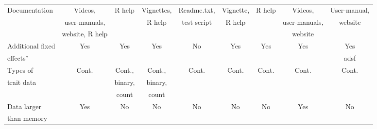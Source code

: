 \documentclass{article}
\begin{document}
\begin{landscape}
\begin{table}
\begin{tabular}{lcccccccc}
\hspace{1mm} Documentation        &  Videos,                &    R help       &  Vignettes,    &   Readme.txt,       &   Vignette,          &     R help           &   Videos,              &  User-manual,     \\  
                                                        &   user-manuals,    &                      &  R help         &    test script           &  R help              &                           &    user-manuals,  &   website  \\
                                                        &   website,    R help          &                      &                     &                              &                           &                           &    website            &    \\   [0.35cm]

                                                                         
\hspace{1mm} Additional fixed        &   Yes   &      Yes      &     Yes    &  No                 &      Yes      &      Yes          &      Yes & Yes     \\  
\hspace{1mm} effects$^c$               &           &                   &                 &                   &                   &                     &              &   adsf    \\  [0.35cm]

\hspace{1mm} Types of  &  Cont.      &   Cont.,          &   Cont.,           &   Cont.                 &   Cont.          &     Cont.           &   Cont.   &  Cont.    \\  
\hspace{1mm} trait data  &                &    binary,      &      binary,         &                   &            &                &      &      \\  
                                      &                &   count         &       count          &                   &            &                &      &      \\  [0.35cm]


\hspace{1mm} Data larger                   &   Yes    &      No      & No          &  No    &  No    &   No     & Yes      & No    \\  
\hspace{1mm} than memory                                             &         &            &             &                   &            &                &      &      \\  [0.8cm]



\end{tabular}
\end{table}
\end{landscape}
\end{document}
